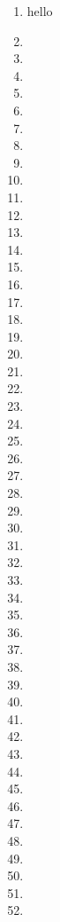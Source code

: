 \begin{multicols}{2}
\begin{enumerate}[label={\arabic*.}]
    
    \item hello
    \item 
    \item
    \item
    \item 
    \item 
    \item 
    \item 
    \item
    \item
    \item
    \item 
    \item
    \item
    \item 
    \item 
    \item 
    \item 
    \item
    \item
    \item
    \item 
    \item
    \item
    \item 
    \item 
    \item 
    \item 
    \item
    \item
    \item
    \item 
    \item
    \item
    \item 
    \item 
    \item 
    \item 
    \item
    \item
    \item
    \item 
    \item
    \item
    \item 
    \item 
    \item 
    \item 
    \item
    \item
    \item
    \item 

\end{enumerate}
\end{multicols}
